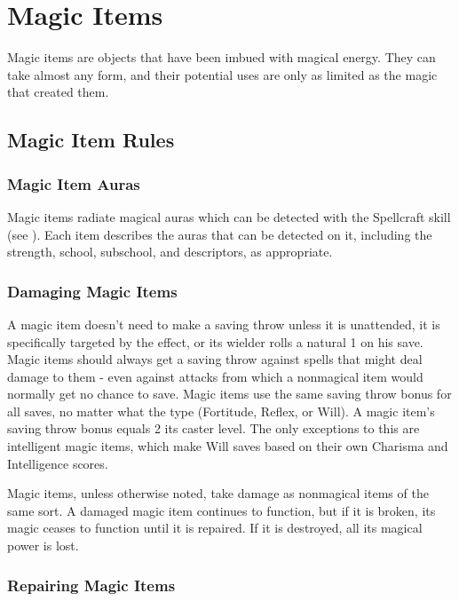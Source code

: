 \chapter{Magic Items}
Magic items are objects that have been imbued with magical energy. They can take almost any form, and their potential uses are only as limited as the magic that created them.

\section{Magic Item Rules}

\subsection{Magic Item Auras}

Magic items radiate magical auras which can be detected with the Spellcraft skill (see ). Each item describes the auras that can be detected on it, including the strength, school, subschool, and descriptors, as appropriate.

\subsection{Damaging Magic Items}

A magic item doesn't need to make a saving throw unless it is unattended, it is specifically targeted by the effect, or its wielder rolls a natural 1 on his save. Magic items should always get a saving throw against spells that might deal damage to them - even against attacks from which a nonmagical item would normally get no chance to save. Magic items use the same saving throw bonus for all saves, no matter what the type (Fortitude, Reflex, or Will). A magic item's saving throw bonus equals 2 \add its caster level. The only exceptions to this are intelligent magic items, which make Will saves based on their own Charisma and Intelligence scores.

Magic items, unless otherwise noted, take damage as nonmagical items of the same sort. A damaged magic item continues to function, but if it is broken, its magic ceases to function until it is repaired. If it is destroyed, all its magical power is lost.

\subsection{Repairing Magic Items}

